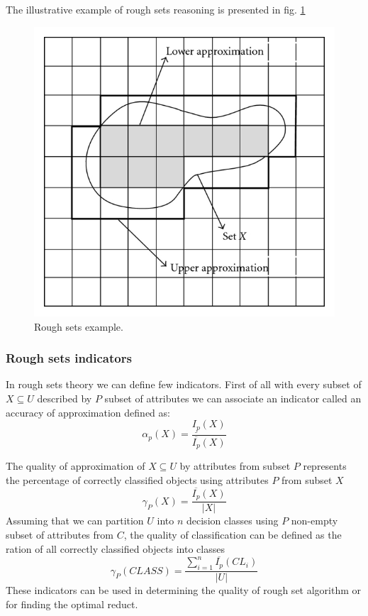 The illustrative example of rough sets reasoning is presented in fig.
\ref{fig:rough_set_example}
\begin{figure}[H] 
    \begin{center}
        \includegraphics{fig/rough_set.png}
    \end{center}
    \caption{Rough sets example.}
    \label{fig:rough_set_example}
\end{figure}

\subsubsection{Rough sets indicators}
\label{cha:Rough_sets_indicators}
In rough sets theory we can define few indicators. First of all with every 
subset of $X \subseteq U$ described by $P$ subset of attributes we can 
associate an indicator called an accuracy of approximation defined as:
$$\alpha_p(X)=\frac{\underline{I_p}(X)}{\overline{I_p}(X)}$$

The quality of approximation of $X \subseteq U$ by attributes from subset $P$
represents the percentage of correctly classified objects using attributes $P$
from subset $X$
$$\gamma_P(X) = \frac{\overline{I_p}(X)}{|X|}$$
Assuming that we can partition $U$ into $n$ decision classes using $P$
non-empty subset of attributes from $C$, the quality of classification can be
defined as the ration of all correctly classified objects into classes
$$\gamma_P(CLASS) = \frac{\sum_{i=1}^{n}\overline{I_p}(CL_i)}{|U|}$$
These indicators can be used in determining the quality of rough set algorithm
or for finding the optimal reduct.
